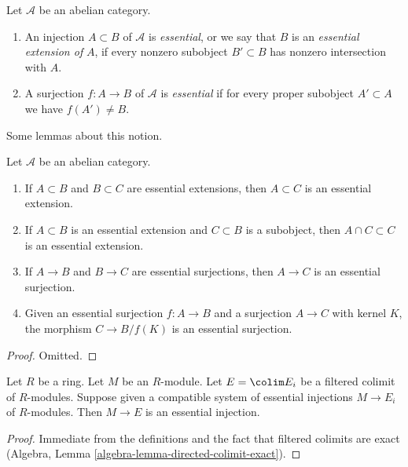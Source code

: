 \begin{definition}
\label{definition-essential}
Let $\mathcal{A}$ be an abelian category.
\begin{enumerate}
\item An injection $A \subset B$ of $\mathcal{A}$ is {\it essential},
or we say that $B$ is an {\it essential extension of} $A$,
if every nonzero subobject $B' \subset B$ has nonzero intersection with $A$.
\item A surjection $f : A \to B$ of $\mathcal{A}$ is {\it essential}
if for every proper subobject $A' \subset A$ we have $f(A') \not = B$.
\end{enumerate}
\end{definition}

\noindent
Some lemmas about this notion.

\begin{lemma}
\label{lemma-essential}
Let $\mathcal{A}$ be an abelian category.
\begin{enumerate}
\item If $A \subset B$ and $B \subset C$ are essential extensions, then
$A \subset C$ is an essential extension.
\item If $A \subset B$ is an essential extension and $C \subset B$
is a subobject, then $A \cap C \subset C$ is an essential extension.
\item If $A \to B$ and $B \to C$ are essential surjections, then
$A \to C$ is an essential surjection.
\item Given an essential surjection $f : A \to B$ and a surjection
$A \to C$ with kernel $K$, the morphism $C \to B/f(K)$ is an essential
surjection.
\end{enumerate}
\end{lemma}

\begin{proof}
Omitted.
\end{proof}

\begin{lemma}
\label{lemma-union-essential-extensions}
Let $R$ be a ring. Let $M$ be an $R$-module. Let $E = \colim E_i$
be a filtered colimit of $R$-modules. Suppose given a compatible
system of essential injections $M \to E_i$ of $R$-modules.
Then $M \to E$ is an essential injection.
\end{lemma}

\begin{proof}
Immediate from the definitions and the fact that filtered
colimits are exact (Algebra, Lemma \ref{algebra-lemma-directed-colimit-exact}).
\end{proof}

